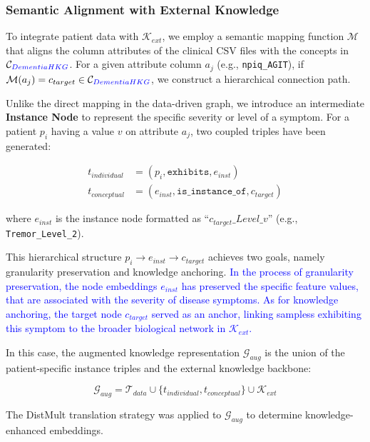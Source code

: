 \documentclass[lettersize,journal]{IEEEtran}
\begin{document}
\subsubsection{Semantic Alignment with External Knowledge}

    To integrate patient data with $\mathcal{K}_{ext}$, we employ a semantic mapping function $\mathcal{M}$ that aligns the column attributes of the clinical CSV files with the concepts in $\mathcal{C}_{\textcolor{blue}{DementiaHKG}}$. For a given attribute column $a_j$ (e.g., \texttt{npiq\_AGIT}), if $\mathcal{M}(a_j) = c_{target} \in \mathcal{C}_{\textcolor{blue}{DementiaHKG}}$, we construct a hierarchical connection path.

    Unlike the direct mapping in the data-driven graph, we introduce an intermediate \textbf{Instance Node} to represent the specific severity or level of a symptom. For a patient $p_i$ having a value $v$ on attribute $a_j$, two coupled triples have been generated:
    
    \begin{align}
        t_{individual} &= (p_i, \texttt{exhibits}, e_{inst}) \\
        t_{conceptual} &= (e_{inst}, \texttt{is\_instance\_of}, c_{target})
        \label{Eq6}
    \end{align}

    where $e_{inst}$ is the instance node formatted as ``$c_{target}\_Level\_v$'' (e.g., \texttt{Tremor\_Level\_2}).

    This hierarchical structure $p_i \to e_{inst} \to c_{target}$ achieves two goals, namely granularity preservation and knowledge anchoring. \textcolor{blue}{In the process of granularity preservation, the node embeddings $e_{inst}$ has preserved the specific feature values, that are associated with the severity of disease symptoms. As for knowledge anchoring, the target node $c_{target}$ served as an anchor, linking sampless exhibiting this symptom to the broader biological network in $\mathcal{K}_{ext}$.}
    
    In this case, the augmented knowledge representation $\mathcal{G}_{aug}$ is the union of the patient-specific instance triples and the external knowledge backbone:
    
    \begin{equation}
        \mathcal{G}_{aug} = \mathcal{T}_{data} \cup \{t_{individual}, t_{conceptual}\} \cup \mathcal{K}_{ext}
    \end{equation}

    The DistMult translation strategy was applied to $\mathcal{G}_{aug}$ to determine knowledge-enhanced embeddings.
\end{document}
